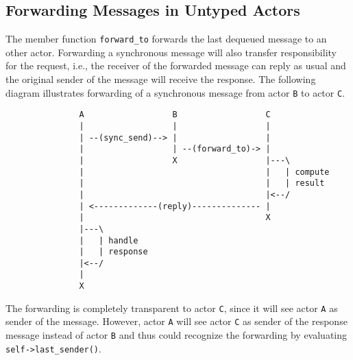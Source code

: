\clearpage
\subsection{Forwarding Messages in Untyped Actors}

The member function \lstinline^forward_to^ forwards the last dequeued message to an other actor.
Forwarding a synchronous message will also transfer responsibility for the request, i.e., the receiver of the forwarded message can reply as usual and the original sender of the message will receive the response.
The following diagram illustrates forwarding of a synchronous message from actor \texttt{B} to actor \texttt{C}.

\begin{footnotesize}
\begin{verbatim}
               A                  B                  C
               |                  |                  |
               | --(sync_send)--> |                  |
               |                  | --(forward_to)-> |
               |                  X                  |---\
               |                                     |   | compute
               |                                     |   | result
               |                                     |<--/
               | <-------------(reply)-------------- |
               |                                     X
               |---\
               |   | handle
               |   | response
               |<--/
               |
               X
\end{verbatim}
\end{footnotesize}

The forwarding is completely transparent to actor \texttt{C}, since it will see actor \texttt{A} as sender of the message.
However, actor \texttt{A} will see actor \texttt{C} as sender of the response message instead of actor \texttt{B} and thus could recognize the forwarding by evaluating \lstinline^self->last_sender()^.